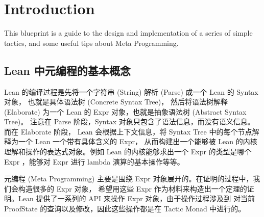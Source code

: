 \chapter{Introduction}
\label{section-introduction}

\noindent
This blueprint is a guide to the design and implementation of a series of simple tactics,
and some useful tips about Meta Programming.

\section{Lean 中元编程的基本概念}

Lean 的编译过程是先将一个字符串 (String) 解析 (Parse) 成一个 Lean 的 Syntax 对象，
也就是具体语法树 (Concrete Syntax Tree)，
然后将语法树解释 (Elaborate) 为一个 Lean 的 Expr 对象，也就是抽象语法树 (Abstract Syntax Tree)。
注意在 Parse 阶段，Syntax 对象只包含了语法信息，而没有语义信息。 而在 Elaborate 阶段，
Lean 会根据上下文信息，将 Syntax Tree 中的每个节点解释为一个 Lean 一个带有具体含义的 Expr，
从而构建出一个能够被 Lean 的内核理解和操作的表达式对象。例如 Lean 的内核能够求出一个 Expr 的类型是哪个 Expr
，能够对 Expr 进行 lambda 演算的基本操作等等。

元编程 (Meta Programming) 主要是围绕 Expr 对象展开的。在证明的过程中，我们会构造很多的 Expr 对象，
希望用这些 Expr 作为材料来构造出一个定理的证明。Lean 提供了一系列的 API 来操作 Expr 对象，由于操作过程涉及到
对当前 ProofState 的查询以及修改，因此这些操作都是在 Tactic Monad 中进行的。

